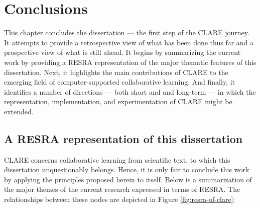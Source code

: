 
\setcounter{chapter}{7}
\chapter{Conclusions}
\label{sec:conclusions}

This chapter concludes the dissertation --- the first step of the CLARE
journey. It attempts to provide a retrospective view of what has been done
thus far and a prospective view of what is still ahead. It begins by
summarizing the current work by providing a RESRA representation of the
major thematic features of this dissertation. Next, it highlights the main
contributions of CLARE to the emerging field of computer-supported
collaborative learning. And finally, it identifies a number of directions
--- both short and and long-term --- in which the representation,
implementation, and experimentation of CLARE might be extended.


\section{A RESRA representation of this dissertation}
\label{sec:c8-summary}

CLARE concerns collaborative learning from scientific text, to which this
dissertation unquestionably belongs. Hence, it is only fair to conclude
this work by applying the principles proposed herein to itself. Below is a
summarization of the major themes of the current research expressed in
terms of RESRA. The relationships between these nodes are depicted in
Figure \ref{fig:resra-of-clare}:

